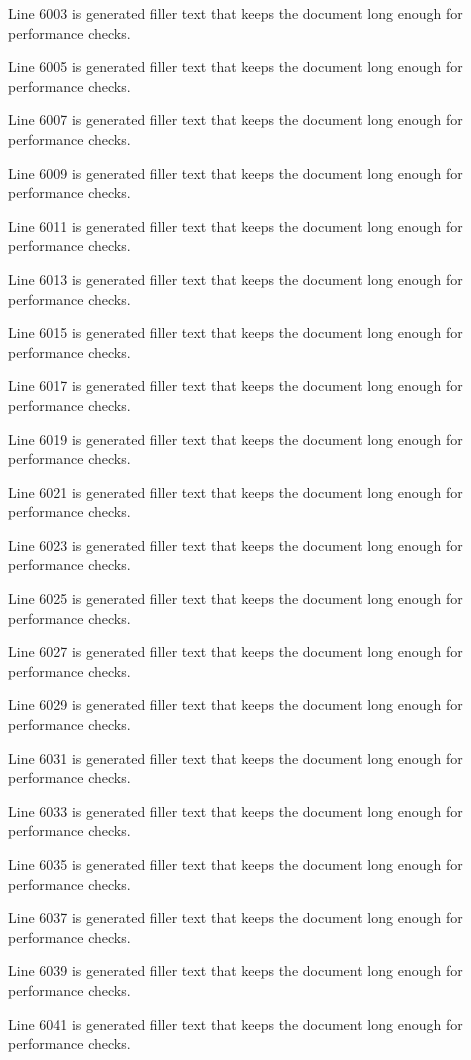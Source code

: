 Line 6003 is generated filler text that keeps the document long enough for performance checks.

Line 6005 is generated filler text that keeps the document long enough for performance checks.

Line 6007 is generated filler text that keeps the document long enough for performance checks.

Line 6009 is generated filler text that keeps the document long enough for performance checks.

Line 6011 is generated filler text that keeps the document long enough for performance checks.

Line 6013 is generated filler text that keeps the document long enough for performance checks.

Line 6015 is generated filler text that keeps the document long enough for performance checks.

Line 6017 is generated filler text that keeps the document long enough for performance checks.

Line 6019 is generated filler text that keeps the document long enough for performance checks.

Line 6021 is generated filler text that keeps the document long enough for performance checks.

Line 6023 is generated filler text that keeps the document long enough for performance checks.

Line 6025 is generated filler text that keeps the document long enough for performance checks.

Line 6027 is generated filler text that keeps the document long enough for performance checks.

Line 6029 is generated filler text that keeps the document long enough for performance checks.

Line 6031 is generated filler text that keeps the document long enough for performance checks.

Line 6033 is generated filler text that keeps the document long enough for performance checks.

Line 6035 is generated filler text that keeps the document long enough for performance checks.

Line 6037 is generated filler text that keeps the document long enough for performance checks.

Line 6039 is generated filler text that keeps the document long enough for performance checks.

Line 6041 is generated filler text that keeps the document long enough for performance checks.

